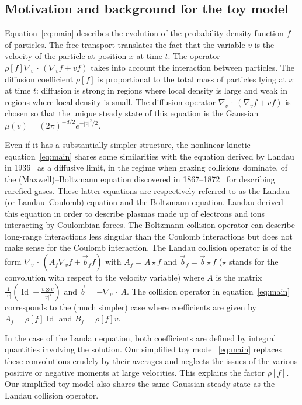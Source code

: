 \documentclass[10pt]{amsart}
\theoremstyle{definition}\newtheorem{defi}[theo]{Definition}\newtheorem{rema}[theo]{Remark}\newtheorem{exam}[theo]{Example}\newtheorem{exem}[theo]{Example}\newtheorem{nota}[theo]{Notation}
\DeclareMathOperator{\Id}{Id}
\begin{document}
\subsection{Motivation and background for the toy model}

Equation~\eqref{eq:main} describes the evolution of the probability density function $f$ of particles. The free transport translates the fact that the variable $v$ is the velocity of the particle at position $x$ at time $t$. The operator $\rho [f] \nabla_v\,\cdot\,(\nabla_v f + vf)$ takes into account the interaction between particles. The diffusion coefficient $\rho [f]$ is proportional to the total mass of particles lying at $x$ at time $t$: diffusion is strong in regions where local density is large and weak in regions where local density is small. The diffusion operator $\nabla_v\,\cdot\,(\nabla_v f + vf)$ is chosen so that the unique steady state of this equation is the Gaussian $\mu(v) = (2\pi)^{-d/2} e^{-|v|^2/2}$.

Even if it has a substantially simpler structure, the nonlinear kinetic equation~\eqref{eq:main} shares some similarities with the equation derived by Landau in 1936~\cite{landau1936} as a diffusive limit, in the regime when grazing collisions dominate, of the (Maxwell)--Boltzmann equation discovered in 1867--1872~\cite{boltzmann1872weitere,clerk1867dynamical} for describing rarefied gases. These latter equations are respectively referred to as the Landau (or Landau--Coulomb) equation and the Boltzmann equation. Landau derived this equation in order to describe plasmas made up of electrons and ions interacting by Coulombian forces. The Boltzmann collision operator can describe long-range interactions less singular than the Coulomb interactions but does not make sense for the Coulomb interaction. The Landau collision operator is of the form $\nabla_v\,\cdot\,(A_f \nabla_vf + \vec b_f f)$ with $A_f = A \star f$ and $\vec b_f = \vec b \star f$ ($\star$ stands for the convolution with respect to the velocity variable) where $A$ is the matrix $\frac{1}{|v|} (\Id -\frac{v \otimes v}{|v|^2})$ and $\vec b= - \nabla_v\,\cdot\,A$. The collision operator in equation~\eqref{eq:main} corresponds to the (much simpler) case where coefficients are given by $A_f = \rho[f] \Id$ and $B_f = \rho[f] v$.

In the case of the Landau equation, both coefficients are defined by integral quantities involving the solution. Our simplified toy model~\eqref{eq:main} replaces these convolutions crudely by their averages and neglects the issues of the various positive or negative moments at large velocities. This explains the factor $\rho[f]$. Our simplified toy model also shares the same Gaussian steady state as the Landau collision operator.
\end{document}
